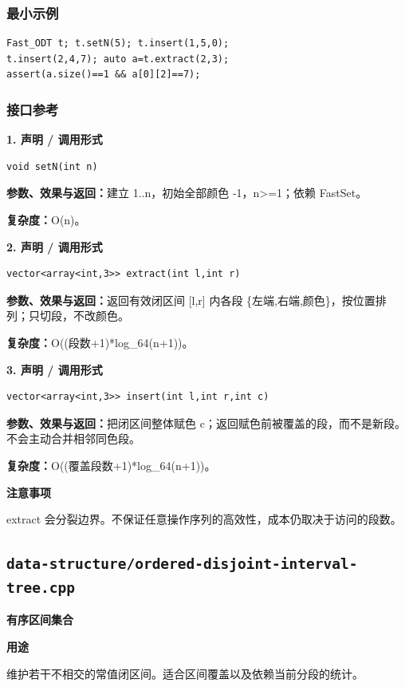 \documentclass[UTF8,a4paper,10pt]{ctexart}
\newcommand{\TemplUsage}[1]{\textbf{用途}\par #1\par}
\newcommand{\TemplNote}[1]{\textbf{注意事项}\par #1\par}
\begin{document}
\subsubsection*{最小示例}
\begin{lstlisting}
Fast_ODT t; t.setN(5); t.insert(1,5,0);
t.insert(2,4,7); auto a=t.extract(2,3);
assert(a.size()==1 && a[0][2]==7);
\end{lstlisting}
\subsubsection*{接口参考}
\noindent\begin{minipage}{\textwidth}
\textbf{1. 声明 / 调用形式}
\begin{lstlisting}
void setN(int n)
\end{lstlisting}
\textbf{参数、效果与返回：}建立 1..n，初始全部颜色 -1，n>=1；依赖 FastSet。

\textbf{复杂度：}O(n)。

\end{minipage}\par\vspace{0.4em}
\noindent\begin{minipage}{\textwidth}
\textbf{2. 声明 / 调用形式}
\begin{lstlisting}
vector<array<int,3>> extract(int l,int r)
\end{lstlisting}
\textbf{参数、效果与返回：}返回有效闭区间 [l,r] 内各段 \{左端,右端,颜色\}，按位置排列；只切段，不改颜色。

\textbf{复杂度：}O((段数+1)*log\_64(n+1))。

\end{minipage}\par\vspace{0.4em}
\noindent\begin{minipage}{\textwidth}
\textbf{3. 声明 / 调用形式}
\begin{lstlisting}
vector<array<int,3>> insert(int l,int r,int c)
\end{lstlisting}
\textbf{参数、效果与返回：}把闭区间整体赋色 c；返回赋色前被覆盖的段，而不是新段。不会主动合并相邻同色段。

\textbf{复杂度：}O((覆盖段数+1)*log\_64(n+1))。

\TemplNote{extract 会分裂边界。不保证任意操作序列的高效性，成本仍取决于访问的段数。}
\end{minipage}\par\vspace{0.4em}
\clearpage
\subsection{\texttt{data-structure/ordered-disjoint-interval-tree.cpp}}
\textbf{有序区间集合}\par
\TemplUsage{维护若干不相交的常值闭区间。适合区间覆盖以及依赖当前分段的统计。}
\end{document}
